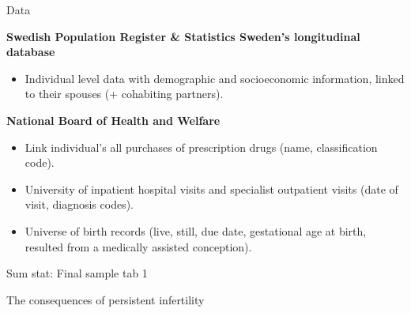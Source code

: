 \documentclass[notes,11pt, aspectratio=169]{beamer}
\newenvironment{wideitemize}{\itemize\addtolength{\itemsep}{0.4em}}{\enditemize}
\begin{document}
\begin{frame}{Data}
\begin{wideitemize}
\item \textbf{Swedish Population Register \& Statistics Sweden's longitudinal database}
	\begin{itemize}
		\item Individual level data with demographic and socioeconomic information, linked to their spouses (+ cohabiting partners).	
	\end{itemize}
\item \textbf{National Board of Health and Welfare}
	\begin{itemize}
		\item Link individual's all purchases of prescription drugs (name, classification code).
		\item University of inpatient hospital visits and specialist outpatient visits (date of visit, diagnosis codes).
		\item Universe of birth records (live, still, due date, gestational age at birth, resulted from a medically assisted conception).
	\end{itemize}
\end{wideitemize}	
\end{frame}

\begin{frame}{Sum stat: Final sample}
	tab 1
\end{frame}

\begin{frame}
	\begin{center}
		\huge{The consequences of persistent infertility}
	\end{center}
\end{frame}
\end{document}
